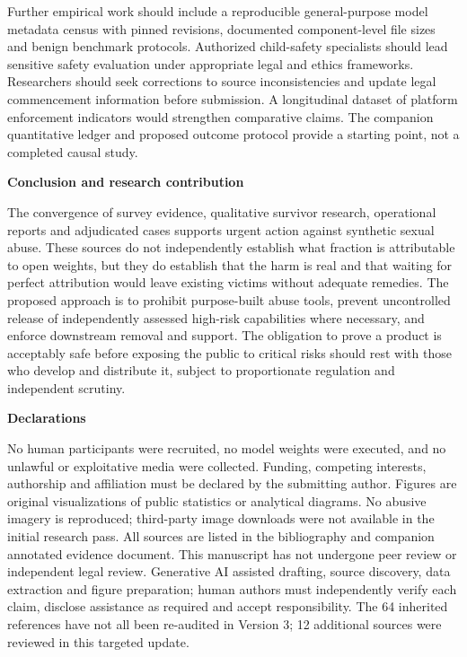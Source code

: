 \documentclass[10pt,a4paper]{article}
\newcommand{\sub}[1]{\vspace{1mm}\textbf{#1}\par}
\begin{document}
Further empirical work should include a reproducible general-purpose model metadata census with pinned revisions, documented component-level file sizes and benign benchmark protocols. Authorized child-safety specialists should lead sensitive safety evaluation under appropriate legal and ethics frameworks. Researchers should seek corrections to source inconsistencies and update legal commencement information before submission. A longitudinal dataset of platform enforcement indicators would strengthen comparative claims. The companion quantitative ledger and proposed outcome protocol provide a starting point, not a completed causal study.


\sub{Conclusion and research contribution}
The convergence of survey evidence, qualitative survivor research, operational reports and adjudicated cases supports urgent action against synthetic sexual abuse. These sources do not independently establish what fraction is attributable to open weights, but they do establish that the harm is real and that waiting for perfect attribution would leave existing victims without adequate remedies. The proposed approach is to prohibit purpose-built abuse tools, prevent uncontrolled release of independently assessed high-risk capabilities where necessary, and enforce downstream removal and support. The obligation to prove a product is acceptably safe before exposing the public to critical risks should rest with those who develop and distribute it, subject to proportionate regulation and independent scrutiny.

\sub{Declarations}

No human participants were recruited, no model weights were executed, and no unlawful or exploitative media were collected. Funding, competing interests, authorship and affiliation must be declared by the submitting author. Figures are original visualizations of public statistics or analytical diagrams. No abusive imagery is reproduced; third-party image downloads were not available in the initial research pass. All sources are listed in the bibliography and companion annotated evidence document. This manuscript has not undergone peer review or independent legal review. Generative AI assisted drafting, source discovery, data extraction and figure preparation; human authors must independently verify each claim, disclose assistance as required and accept responsibility. The 64 inherited references have not all been re-audited in Version 3; 12 additional sources were reviewed in this targeted update.
\end{document}
